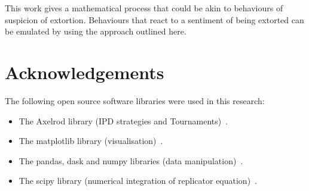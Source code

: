 \documentclass[a4paper]{article}
\begin{document}
This work gives a mathematical process that could be akin to behaviours of
suspicion of extortion. Behaviours that react to a sentiment of being extorted
can be emulated by using the approach outlined here.

\section*{Acknowledgements}

The following open source software libraries were used in this research:

\begin{itemize}
    \item The Axelrod library (IPD strategies and
        Tournaments)~\cite{Knight2016, Knight2018}.
    \item The matplotlib library (visualisation)~\cite{Droettboom2018}.
    \item The pandas, dask and numpy libraries (data
        manipulation)~\cite{Structures2010, Dask2016, Oliphant2015}.
    \item The scipy library (numerical integration of replicator
        equation)~\cite{Jones2001}.
\end{itemize}

\printbibliography
\end{document}
